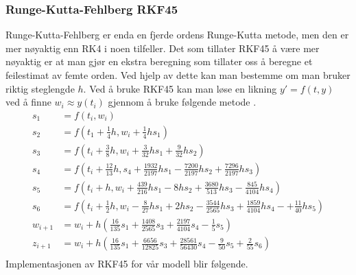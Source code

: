 \subsubsection{Runge-Kutta-Fehlberg RKF45}
Runge-Kutta-Fehlberg er enda en fjerde ordens Runge-Kutta metode, men den er mer nøyaktig enn RK4 i noen tilfeller. Det som tillater RKF45 å være mer nøyaktig er at man gjør en ekstra beregning som tillater oss å beregne et feilestimat av femte orden. Ved hjelp av dette kan man bestemme om man bruker riktig steglengde $h$.\newline\newline
Ved å bruke RKF45 kan man løse en likning $y' = f(t, y)$ ved å finne $w_i \approx y(t_i)$ gjennom å bruke følgende metode \cite{MATEMATIKK:1}. 
\begin{equation}
\begin{aligned}
    s_1&=f(t_i, w_i)\\
    s_2&=f(t_1+\frac{1}{4}h, w_i + \frac{1}{4}hs_1)\\
    s_3&=f(t_i+\frac{3}{8}h, w_i+\frac{3}{32}hs_1+\frac{9}{32}hs_2)\\
    s_4&=f(t_i+\frac{12}{13}h, s_4+\frac{1932}{2197}hs_1-\frac{7200}{2197}hs_2+\frac{7296}{2197}hs_3)\\
    s_5&=f(t_i+h, w_i + \frac{439}{216}hs_1-8hs_2+\frac{3680}{513}hs_3-\frac{845}{4104}hs_4)\\
    s_6&=f(t_i+\frac{1}{2}h, w_i-\frac{8}{27}hs_1+2hs_2-\frac{3544}{2565}hs_3+\frac{1859}{4104}hs_4-+\frac{11}{40}hs_5)\\
    w_{i+1}&=w_i+h(\frac{16}{135}s_1+\frac{1408}{2565}s_3+\frac{2197}{4104}s_4-\frac{1}{5}s_5)\\
    z_{i+1}&=w_i+h(\frac{16}{135}s_1+\frac{6656}{12825}s_3+\frac{28561}{56430}s_4-\frac{9}{50}s_5+\frac{2}{55}s_6)\\
\end{aligned}
\end{equation}
Implementasjonen av RKF45 for vår modell blir følgende.

